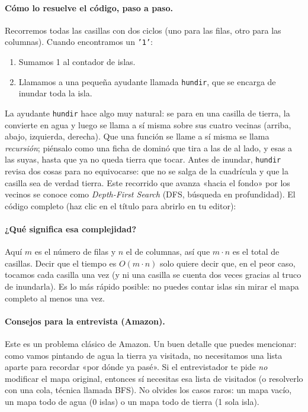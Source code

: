 \paragraph{Cómo lo resuelve el código, paso a paso.} Recorremos todas las
casillas con dos ciclos (uno para las filas, otro para las columnas). Cuando
encontramos un \texttt{'1'}:
\begin{enumerate}
  \item Sumamos 1 al contador de islas.
  \item Llamamos a una pequeña ayudante llamada \texttt{hundir}, que se encarga
        de inundar toda la isla.
\end{enumerate}
La ayudante \texttt{hundir} hace algo muy natural: se para en una casilla de
tierra, la convierte en agua y luego se llama a sí misma sobre sus cuatro
vecinas (arriba, abajo, izquierda, derecha). Que una función se llame a sí
misma se llama \emph{recursión}; piénsalo como una ficha de dominó que tira a
las de al lado, y esas a las suyas, hasta que ya no queda tierra que tocar.
Antes de inundar, \texttt{hundir} revisa dos cosas para no equivocarse: que no
se salga de la cuadrícula y que la casilla sea de verdad tierra. Este recorrido que
avanza «hacia el fondo» por los vecinos se conoce como \emph{Depth-First
Search} (DFS, búsqueda en profundidad). El código completo (haz clic en el título para
abrirlo en tu editor):




\paragraph{¿Qué significa esa complejidad?} Aquí $m$ es el número de filas y
$n$ el de columnas, así que $m\cdot n$ es el total de casillas. Decir que el
tiempo es $O(m\cdot n)$ solo quiere decir que, en el peor caso, tocamos cada
casilla una vez (y ni una casilla se cuenta dos veces gracias al truco de
inundarla). Es lo más rápido posible: no puedes contar islas sin mirar el mapa
completo al menos una vez.

\paragraph{Consejos para la entrevista (Amazon).} Este es un problema clásico
de Amazon. Un buen detalle que puedes mencionar: como vamos pintando de agua la
tierra ya visitada, no necesitamos una lista aparte para recordar «por dónde ya
pasé». Si el entrevistador te pide \emph{no} modificar el mapa original,
entonces sí necesitas esa lista de visitados (o resolverlo con una cola, técnica
llamada BFS). No olvides los casos raros: un mapa vacío, un mapa todo de agua
(0 islas) o un mapa todo de tierra (1 sola isla).
